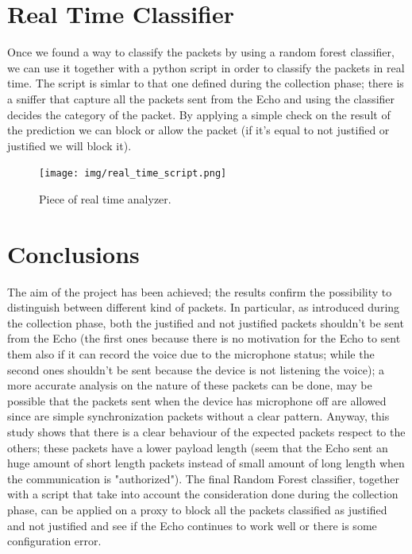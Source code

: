 \documentclass[sigconf]{acmart}
\begin{document}
\section{Real Time Classifier}
Once we found a way to classify the packets by using a random forest classifier, we can use it together with a python script in order to classify the packets in real time. The script is simlar to that one defined during the collection phase; there is a sniffer that capture all the packets sent from the Echo and using the classifier decides the category of the packet.
By applying a simple check on the result of the prediction we can block or allow the packet (if it's equal to not justified or justified we will block it).
\begin{figure}[h!]
        \texttt{[image: img/real\_time\_script.png]}
        \caption{Piece of real time analyzer.}
        \label{fig:real_time_script}
    \end{figure}

    \section{Conclusions}
    The aim of the project has been achieved; the results confirm the possibility to distinguish between different kind of packets. In particular, as introduced during the collection phase, both the justified and not justified packets shouldn't be sent from the Echo (the first ones because there is no motivation for the Echo to sent them also if it can record the voice due to the microphone status; while the second ones shouldn't be sent because the device is not listening the voice); a more accurate analysis on the nature of these packets can be done, may be possible that the packets sent when the device has microphone off are allowed since are simple synchronization packets without a clear pattern. Anyway, this study shows that there is a clear behaviour of the expected packets respect to the others; these packets have a lower payload length (seem that the Echo sent an huge amount of short length packets instead of small amount of long length when the communication is "authorized").
The final Random Forest classifier, together with a script that take into account the consideration done during the collection phase, can be applied on a proxy to block all the packets classified as justified and not justified and see if the Echo continues to work well or there is some configuration error.

    
    
\end{document}
